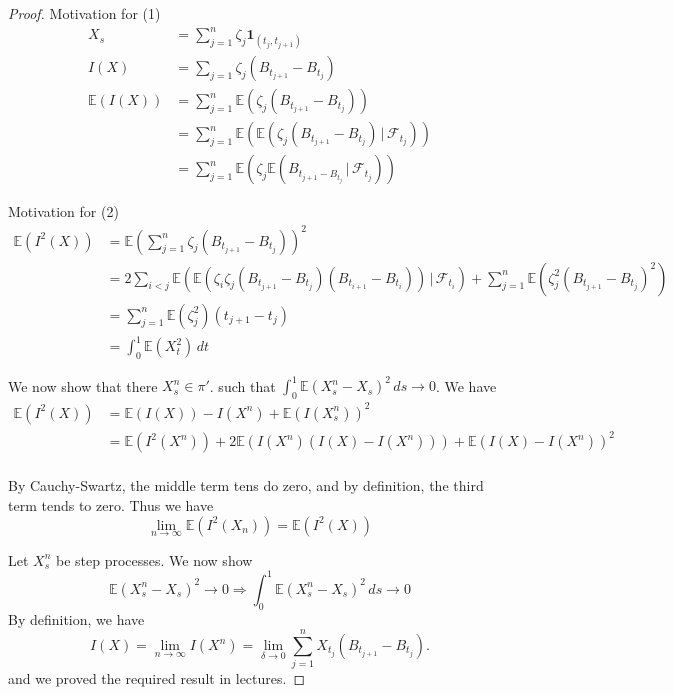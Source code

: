\documentclass[10pt, oneside, reqno]{amsart}
\theoremstyle{plain}%
\theoremstyle{definition}
\theoremstyle{remark}
\newcommand{\E}{\mathbb{E}}
\newcommand{\sigf}{\mathcal{F}}
\begin{document}
\begin{proof}
    Motivation for (1)
    \begin{align*}
        X_s &= \sum_{j=1}^n \zeta_j \mathbf{1}_{(t_j, t_{j+1})} \\
        I(X) &= \sum_{j=1} \zeta_j (B_{t_{j+1}} - B_{t_j}) \\
        \E(I(X)) &= \sum_{j=1}^n \E(\zeta_j (B_{t_{j+1}} - B_{t_j})) \\
                    &= \sum_{j=1}^n \E(\E(\zeta_j (B_{t_{j+1}} - B_{t_j})\, | \, \sigf_{t_j})) \\
                    &= \sum_{j=1}^n \E(\zeta_j  \E(B_{t_{j+1} - B_{t_j}} \, | \, \sigf_{t_j}))  
    \end{align*}
    
    Motivation for (2)
    \begin{align*}
        \E( I^2(X)) &= \E(\sum_{j=1}^n \zeta_j (B_{t_{j+1}} - B_{t_j}))^2 \\
                    &= 2 \sum_{i < j} \E(\E( \zeta_i \zeta_j (B_{t_{j+1}} - B_{t_j})(B_{t_{i+1}} - B_{t_i})) \, | \, \sigf_{t_i} ) + \sum_{j=1}^n \E(\zeta_j^2 (B_{t_{j+1}} - B_{t_{j}})^2 )  \\
                    &= \sum_{j=1}^n \E(\zeta_j^2) (t_{j+1} - t_{j}) \\
                    &= \int_0^1 \E(X_t^2) \, dt             
    \end{align*}
    
    We now show that there $X_s^n \in \pi'$.  such that $\int_0^1 \E(X_s^n - X_s)^2 \, ds \rightarrow 0$.  We have \begin{align*}
        \E(I^2(X)) &= \E(I(X)) - I(X^n) + \E(I(X^n_s))^2 \\
                &= \E(I^2(X^n)) + 2 \E(I(X^n)(I(X) - I(X^n)) ) + \E(I(X) - I(X^n))^2 \\ 
    \end{align*}
    
    By Cauchy-Swartz, the middle term tens do zero, and by definition, the third term tends to zero.  Thus we have 
    \[
        \lim_{n \rightarrow \infty} \E(I^2(X_n)) = \E(I^2(X))
    \]
    
    Let $X_s^n$ be step processes.  We now show \[
        \E(X_s^n - X_s)^2 \rightarrow 0 \Rightarrow \int_0^1 \E(X_s^n - X_s)^2 \, ds \rightarrow 0
    \] 
    By definition, we have \[
        I(X) = \lim_{n \rightarrow \infty} I(X^n) = \lim_{\delta \rightarrow 0} \sum_{j=1}^n X_{t_j} (B_{t_{j+1}} - B_{t_j}).  
    \] and we proved the required result in lectures.
    

\end{proof}
\end{document}
